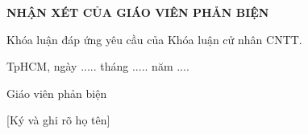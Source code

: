 \newpage
\begin{center}
{}
\textbf{\Large NHẬN XÉT CỦA GIÁO VIÊN PHẢN BIỆN }
\vspace{1cm}
\dotcolumnfill
\raggedright Khóa luận đáp ứng yêu cầu của Khóa luận cử nhân CNTT.
\end{center}


\hspace{7cm}TpHCM, ngày ..... tháng ..... năm ....

\hspace{8.5cm}Giáo viên phản biện

\hspace{8.5cm}[Ký và ghi rõ họ tên]
